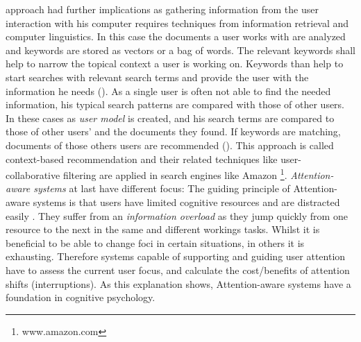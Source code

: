 approach had further implications as gathering information from the user interaction with his computer requires techniques from information retrieval and computer linguistics. In this case the documents a user works with are analyzed and keywords are stored as vectors or a bag of words. The relevant keywords shall help to narrow the topical context a user is working on. Keywords than help to start searches with relevant search terms and provide the user with the information he needs (\cite{budzik2000user}).  As a single user is often not able to find the needed information, his typical search patterns are compared with those of other users. In these cases as \textit{user model} is created, and his search terms are compared to those of other users' and the documents they found. If keywords are matching, documents of those others users are recommended (\cite{anand2007contextual}). This approach is called context-based recommendation and their related techniques like user-collaborative filtering are applied in search engines like Amazon \footnote{www.amazon.com}. \textit{Attention-aware systems} at last have different focus: The guiding principle of Attention-aware systems is that users have limited cognitive resources and are distracted easily . They suffer from an \textit{information overload} as they jump quickly from one resource to the next in the same and different workings tasks. Whilst it is beneficial to be able to change foci in certain situations, in others it is exhausting. Therefore systems capable of supporting and guiding user attention have to assess the current user focus, and calculate the cost/benefits of attention shifts (interruptions). As this explanation shows, Attention-aware systems have a foundation in cognitive psychology. 
